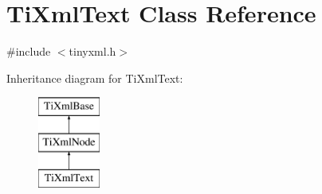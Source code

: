 \hypertarget{classTiXmlText}{\section{Ti\-Xml\-Text Class Reference}
\label{classTiXmlText}
}


{\ttfamily \#include $<$tinyxml.\-h$>$}

Inheritance diagram for Ti\-Xml\-Text\-:\begin{figure}[H]
\begin{center}
\leavevmode
\includegraphics[height=3.000000cm]{classTiXmlText}
\end{center}
\end{figure}
